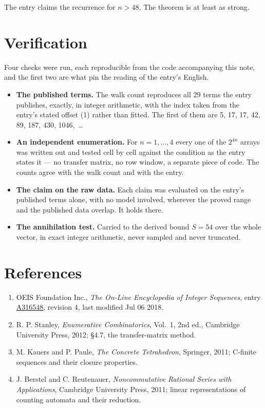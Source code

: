 \documentclass[11pt]{article}
\theoremstyle{definition}
\begin{document}
The entry claims the recurrence for $n > 48$. The theorem is at least as strong.

\section{Verification}

Four checks were run, each reproducible from the code accompanying this note, and the first two are what pin the reading of the entry's English.

\begin{itemize}

\item {\bfseries The published terms.} The walk count reproduces all 29 terms the entry publishes, exactly, in integer arithmetic, with the index taken from the entry's stated offset (1) rather than fitted. The first of them are 5, 17, 17, 42, 89, 187, 430, 1046,~\dots

\item {\bfseries An independent enumeration.} For $n = 1,\dots,4$ every one of the $2^{4n}$ arrays was written out and tested cell by cell against the condition as the entry states it --- no transfer matrix, no row window, a separate piece of code. The counts agree with the walk count and with the entry.

\item {\bfseries The claim on the raw data.} Each claim was evaluated on the entry's published terms alone, with no model involved, wherever the proved range and the published data overlap. It holds there.

\item {\bfseries The annihilation test.} Carried to the derived bound $S = 54$ over the whole vector, in exact integer arithmetic, never sampled and never truncated.

\end{itemize}

\section{References}

\begin{enumerate}

\item OEIS Foundation Inc., \emph{The On-Line Encyclopedia of Integer Sequences}, entry \href{https://oeis.org/A316548}{A316548}, revision 4, last modified Jul 06 2018.

\item R. P. Stanley, \emph{Enumerative Combinatorics}, Vol.~1, 2nd ed., Cambridge University Press, 2012; \S4.7, the transfer-matrix method.

\item M. Kauers and P. Paule, \emph{The Concrete Tetrahedron}, Springer, 2011; C-finite sequences and their closure properties.

\item J. Berstel and C. Reutenauer, \emph{Noncommutative Rational Series with Applications}, Cambridge University Press, 2011; linear representations of counting automata and their reduction.

\end{enumerate}
\end{document}
